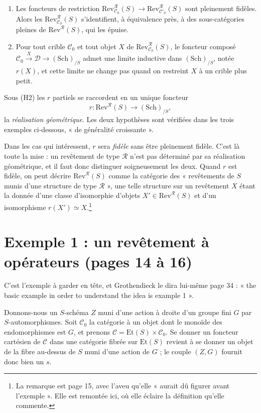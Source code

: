 \documentclass[11pt,a4paper]{article}
\begin{document}
\begin{enumerate}
  \item[(H1)] Les foncteurs de restriction
    $\mathrm{Rev}^{\mathcal{R}}_{\mathcal{C}_{0}}(S) \to
    \mathrm{Rev}^{\mathcal{R}}_{\mathcal{C}'_{0}}(S)$ sont pleinement fidèles.
    Alors les $\mathrm{Rev}^{\mathcal{R}}_{\mathcal{C}_{0}}(S)$ s'identifient,
    à équivalence près, à des sous-catégories pleines de
    $\mathrm{Rev}^{\mathcal{R}}(S)$, qui les épuise.
  \item[(H2)] Pour tout crible $\mathcal{C}_{0}$ et tout objet $X$ de
    $\mathrm{Rev}^{\mathcal{R}}_{\mathcal{C}_{0}}(S)$, le foncteur composé
    $\mathcal{C}_{0} \xrightarrow{\ X\ } \mathcal{D} \to (\mathrm{Sch})_{/S}$
    admet une limite inductive dans $(\mathrm{Sch})_{/S}$, notée $r(X)$, et
    cette limite ne change pas quand on restreint $X$ à un crible plus petit.
\end{enumerate}

Sous (H2) les $r$ partiels se raccordent en un unique foncteur
\[
  r : \mathrm{Rev}^{\mathcal{R}}(S) \longrightarrow (\mathrm{Sch})_{/S} ,
\]
la \emph{réalisation géométrique}. Les deux hypothèses sont vérifiées dans les
trois exemples ci-dessous, « de généralité croissante ».

Dans les cas qui intéressent, $r$ sera \emph{fidèle} sans être pleinement
fidèle. C'est là toute la mise : un revêtement de type $\mathcal{R}$ n'est pas
déterminé par sa réalisation géométrique, et il faut donc distinguer
soigneusement les deux. Quand $r$ est fidèle, on peut décrire
$\mathrm{Rev}^{\mathcal{R}}(S)$ comme la catégorie des « revêtements de $S$
munis d'une structure de type $\mathcal{R}$ », une telle structure sur un
revêtement $X$ étant la donnée d'une classe d'isomorphie d'objets
$X' \in \mathrm{Rev}^{\mathcal{R}}(S)$ et d'un isomorphisme
$r(X') \simeq X$.\footnote{La remarque est page 15, avec l'aveu qu'elle
« aurait dû figurer avant l'exemple ». Elle est remontée ici, où elle éclaire
la définition qu'elle commente.}

\section*{Exemple 1 : un revêtement à opérateurs (pages 14 à 16)}

C'est l'exemple à garder en tête, et Grothendieck le dira lui-même page 34 :
« the basic example in order to understand the idea is example 1 ».

Donnons-nous un $S$-schéma $Z$ muni d'une action à droite d'un groupe fini $G$
par $S$-automorphismes. Soit $\mathcal{C}_{0}$ la catégorie à un objet dont le
monoïde des endomorphismes est $G$, et prenons
$\mathcal{C} = \mathrm{Et}(S) \times \mathcal{C}_{0}$. Se donner un foncteur
cartésien de $\mathcal{C}$ dans une catégorie fibrée sur $\mathrm{Et}(S)$
revient à se donner un objet de la fibre au-dessus de $S$ muni d'une action de
$G$ ; le couple $(Z, G)$ fournit donc bien un $s$.
\end{document}
